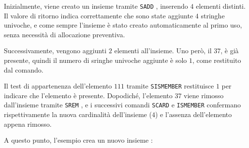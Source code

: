 Inizialmente, viene creato un insieme tramite \verb|SADD| , inserendo $4$ elementi
distinti. Il valore di ritorno indica correttamente che sono state aggiunte $4$ stringhe univoche, e
come sempre l'insieme è stato creato automaticamente al primo uso, senza necessità di allocazione
preventiva.

\begin{center}
\end{center}

Successivamente, vengono aggiunti $2$ elementi all'insieme. Uno però, il $37$, è già presente,
quindi il numero di sringhe univoche aggiunte è solo $1$, come restituito dal comando.

\begin{center}
\end{center}

Il test di appartenenza dell'elemento $111$ tramite \verb|SISMEMBER|  restituisce $1$ per 
indicare che l'elemento è presente. Dopodiché, l'elemento $37$ viene rimosso dall'insieme tramite
\verb|SREM| , e i successivi comandi \verb|SCARD| e \verb|ISMEMBER| confermano 
rispettivamente la nuova cardinalità dell'insieme ($4$) e l'assenza dell'elemento appena rimosso.

\begin{center}
\end{center}

A questo punto, l'esempio crea un nuovo insieme : 

